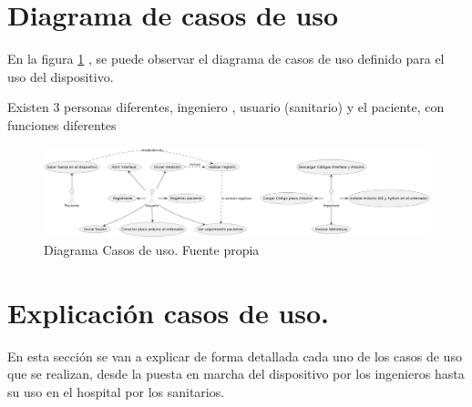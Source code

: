 
\section{Diagrama de casos de uso}
En la figura \ref{fig:Diagrama Casos de uso} , se puede observar el diagrama de casos de uso definido para el uso del dispositivo. 

Existen 3 personas diferentes, ingeniero , usuario (sanitario) y el paciente, con funciones diferentes 
\begin{figure}
    \centering
    \includegraphics[width=1\linewidth]{img/Diagrama Casos de Uso.png}
    \caption{Diagrama Casos de uso. Fuente propia}
    \label{fig:Diagrama Casos de uso}
\end{figure}
\section{Explicación casos de uso.}

En esta sección se van a explicar de forma detallada cada uno de los casos de uso que se realizan, desde la puesta en marcha del dispositivo por los ingenieros hasta su uso en el hospital por los sanitarios.


